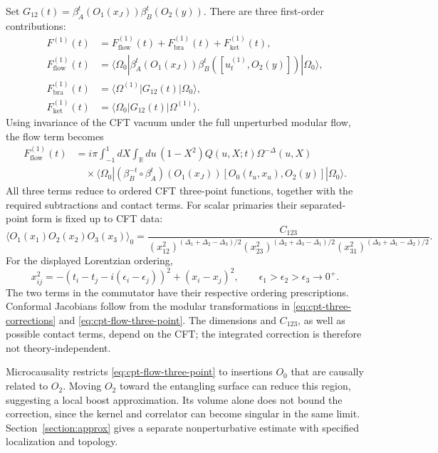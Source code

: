 \documentclass[a4paper,11pt]{article}
\theoremstyle{definition}
\begin{document}
Set $G_{12}(t)=\beta_A^t(O_1(x_J))\beta_B^t(O_2(y))$. There are three first-order contributions:
\begin{align}
 F^{(1)}(t)&=F^{(1)}_{\mathrm{flow}}(t)
 +F^{(1)}_{\mathrm{bra}}(t)+F^{(1)}_{\mathrm{ket}}(t),\nonumber\\
 F^{(1)}_{\mathrm{flow}}(t)
 &=\langle\Omega_0|\beta_A^t(O_1(x_J))
 \beta_B^t([u_t^{(1)},O_2(y)])|\Omega_0\rangle,\nonumber\\
 F^{(1)}_{\mathrm{bra}}(t)&=\langle\Omega^{(1)}|G_{12}(t)|\Omega_0\rangle,\nonumber\\
 F^{(1)}_{\mathrm{ket}}(t)&=\langle\Omega_0|G_{12}(t)|\Omega^{(1)}\rangle.
 \label{eq:cpt-three-corrections}
\end{align}
Using invariance of the CFT vacuum under the full unperturbed modular flow, the flow term becomes
\begin{align}
 F^{(1)}_{\mathrm{flow}}(t)
 &=i\pi\int_{-1}^1dX\int_{\mathbb R}du\,
 (1-X^2)Q(u,X;t)\Omega^{-\Delta}(u,X)\nonumber\\
 &\quad\times\langle\Omega_0|
 (\beta_B^{-t}\circ\beta_A^t)(O_1(x_J))
 [O_0(t_u,x_u),O_2(y)]|\Omega_0\rangle.
 \label{eq:cpt-flow-three-point}
\end{align}
All three terms reduce to ordered CFT three-point functions, together with the required subtractions and contact terms. For scalar primaries their separated-point form is fixed up to CFT data:
\begin{equation}
 \langle O_1(x_1)O_2(x_2)O_3(x_3)\rangle_0
 =\frac{C_{123}}
 {(x_{12}^2)^{(\Delta_1+\Delta_2-\Delta_3)/2}
  (x_{23}^2)^{(\Delta_2+\Delta_3-\Delta_1)/2}
  (x_{31}^2)^{(\Delta_3+\Delta_1-\Delta_2)/2}}.
 \label{eq:cpt-scalar-three-point}
\end{equation}
For the displayed Lorentzian ordering,
\begin{equation}
 x_{ij}^2=-(t_i-t_j-i(\epsilon_i-\epsilon_j))^2+(x_i-x_j)^2,
 \qquad \epsilon_1>\epsilon_2>\epsilon_3\to0^+.
\end{equation}
The two terms in the commutator have their respective ordering prescriptions. Conformal Jacobians follow from the modular transformations in \eqref{eq:cpt-three-corrections} and \eqref{eq:cpt-flow-three-point}. The dimensions and $C_{123}$, as well as possible contact terms, depend on the CFT; the integrated correction is therefore not theory-independent.

Microcausality restricts \eqref{eq:cpt-flow-three-point} to insertions $O_0$ that are causally related to $O_2$. Moving $O_2$ toward the entangling surface can reduce this region, suggesting a local boost approximation. Its volume alone does not bound the correction, since the kernel and correlator can become singular in the same limit. Section~\ref{section:approx} gives a separate nonperturbative estimate with specified localization and topology.
\end{document}
